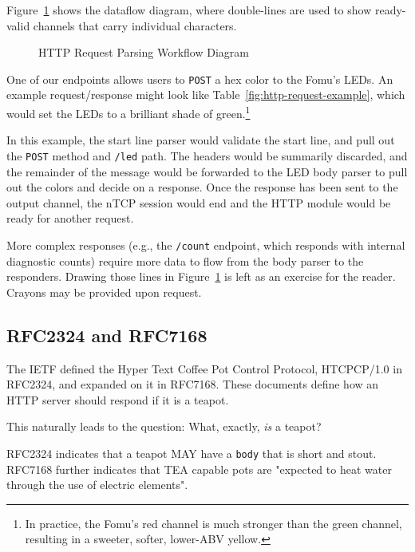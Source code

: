 \documentclass[sigconf,authorversion,nonacm]{acmart}
\begin{document}
Figure~\ref{fig:http-request-parsing} shows the dataflow diagram, where double-lines
are used to show ready-valid channels that carry individual characters.

\begin{figure}[htbp]

\caption{HTTP Request Parsing Workflow Diagram}
\label{fig:http-request-parsing}
\end{figure}

One of our endpoints allows users to \texttt{POST} a hex color to the Fomu's LEDs.
An example request/response might look like Table~\ref{fig:http-request-example}, which would 
set the LEDs to a brilliant shade of green.\footnote{In practice, the Fomu's red channel is much stronger than the green channel, resulting in a sweeter, softer, lower-ABV yellow.}

In this example, the start line parser would validate the start line, and pull out the \texttt{POST} method and \texttt{/led} path.
The headers would be summarily discarded, and the remainder of the message would be forwarded to the LED body parser to pull out the colors and decide on a response.
Once the response has been sent to the output channel, the nTCP session would end and the HTTP module would be ready for another request.

More complex responses (e.g., the \texttt{/count} endpoint, which responds with internal diagnostic counts) require
more data to flow from the body parser to the responders. Drawing those lines in Figure~\ref{fig:http-request-parsing}
is left as an exercise for the reader. Crayons may be provided upon request.

\subsection{RFC2324 and RFC7168}


The IETF defined the Hyper Text Coffee Pot Control Protocol, HTCPCP/1.0 in RFC2324\cite{rfc2324},
and expanded on it in RFC7168\cite{rfc7168}.
These documents define how an HTTP server should respond if it is a teapot.

This naturally leads to the question: What, exactly, \textit{is} a teapot?

RFC2324 indicates that a teapot MAY have a \texttt{body} that is short and stout.
RFC7168 further indicates that TEA capable pots are "expected to heat water through the use of electric elements".
\end{document}
